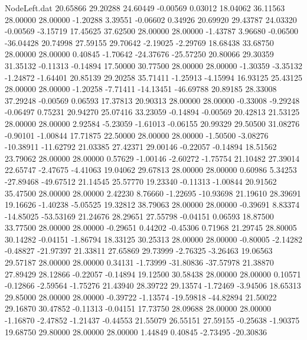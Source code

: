 \begin{filecontents}{NodeLeft.dat}
  20.65866   29.20288   24.60449    -0.00569    0.03012   18.04062   36.11563   28.00000   28.00000   -1.20288    3.39551   -0.06602    0.34926
  20.69920   29.43787   24.03320    -0.00569   -3.15719   17.45625   37.62500   28.00000   28.00000   -1.43787    3.96680   -0.06500  -36.04428
  20.74998   27.59155   29.70642    -2.19025   -2.29769   18.68438   33.68750   28.00000   28.00000    0.40845   -1.70642  -24.37676  -25.57250
  20.80066   29.30359   31.35132    -0.11313   -0.14894   17.50000   30.77500   28.00000   28.00000   -1.30359   -3.35132   -1.24872   -1.64401
  20.85139   29.20258   35.71411    -1.25913   -4.15994   16.93125   25.43125   28.00000   28.00000   -1.20258   -7.71411  -14.13451  -46.69788
  20.89185   28.33008   37.29248    -0.00569    0.06593   17.37813   20.90313   28.00000   28.00000   -0.33008   -9.29248   -0.06497    0.75231
  20.94270   25.07416   33.23059    -0.14894   -0.00569   20.42813   21.53125   28.00000   28.00000    2.92584   -5.23059   -1.61013   -0.06155
  20.99329   29.50500   31.08276    -0.90101   -1.00844   17.71875   22.50000   28.00000   28.00000   -1.50500   -3.08276  -10.38911  -11.62792
  21.03385   27.42371   29.00146    -0.22057   -0.14894   18.51562   23.79062   28.00000   28.00000    0.57629   -1.00146   -2.60272   -1.75754
  21.10482   27.39014   22.65747    -2.47675   -4.41063   19.04062   29.67813   28.00000   28.00000    0.60986    5.34253  -27.89468  -49.67512
  21.14545   25.57770   19.23340    -0.11313   -1.00844   20.91562   35.47500   28.00000   28.00000    2.42230    8.76660   -1.22695  -10.93698
  21.19610   28.39691   19.16626    -1.40238   -5.05525   19.32812   38.79063   28.00000   28.00000   -0.39691    8.83374  -14.85025  -53.53169
  21.24676   28.29651   27.55798    -0.04151    0.06593   18.87500   33.77500   28.00000   28.00000   -0.29651    0.44202   -0.45306    0.71968
  21.29745   28.80005   30.14282    -0.04151   -1.86794   18.33125   30.25313   28.00000   28.00000   -0.80005   -2.14282   -0.48827  -21.97397
  21.33811   27.65869   29.73999    -2.76325   -3.26463   19.06563   29.57187   28.00000   28.00000    0.34131   -1.73999  -31.80836  -37.57978
  21.38870   27.89429   28.12866    -0.22057   -0.14894   19.12500   30.58438   28.00000   28.00000    0.10571   -0.12866   -2.59564   -1.75276
  21.43940   28.39722   29.13574    -1.72469   -3.94506   18.65313   29.85000   28.00000   28.00000   -0.39722   -1.13574  -19.59818  -44.82894
  21.50022   29.16870   30.47852    -0.11313   -0.04151   17.73750   28.09688   28.00000   28.00000   -1.16870   -2.47852   -1.21437   -0.44553
  21.55079   26.55151   27.59155    -0.25638   -1.90375   19.68750   29.80000   28.00000   28.00000    1.44849    0.40845   -2.73495  -20.30836

\end{filecontents}

